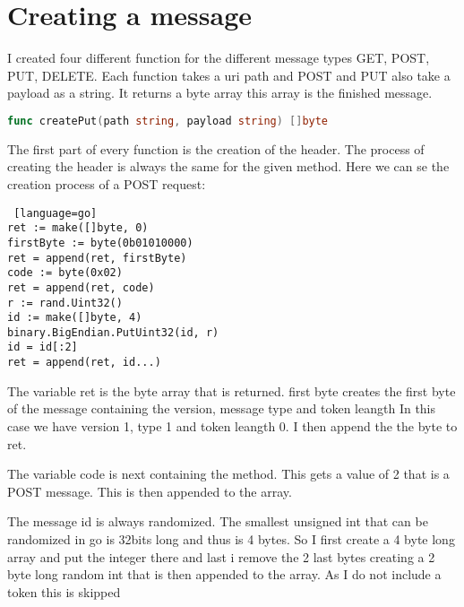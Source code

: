 \documentclass{article}
\title{\gettitle}
\author{\getauthor}
\date{\daymonthyear\today} %
\newcommand{\getauthor}{Elias Berglin} %
\newcommand{\gettitle}{COAP implementation} %
\begin{document}
    \maketitle
    \newpage

    \fancyhf{}
    \lhead{\getauthor}
    \rhead{\gettitle}
    \rfoot \thepage

    \section{Creating a message}
    I created four different function for the different message types GET, POST, PUT, DELETE.
    Each function takes a uri path and POST and PUT also take a payload as a string. It returns a byte array
    this array is the finished message. 
    \begin{lstlisting}[language=go]
func createPut(path string, payload string) []byte
    \end{lstlisting}
    The first part of every function is the creation of the header.
    The process of creating the header is always the same for the given method.
    Here we can se the creation process of a POST request:
    \begin{lstlisting} [language=go]
ret := make([]byte, 0)
firstByte := byte(0b01010000)
ret = append(ret, firstByte)
code := byte(0x02)
ret = append(ret, code)
r := rand.Uint32()
id := make([]byte, 4)
binary.BigEndian.PutUint32(id, r)
id = id[:2]
ret = append(ret, id...)
    \end{lstlisting}
    The variable ret is the byte array that is returned. 
    first byte creates the first byte of the message containing the version, message type and token leangth
    In this case we have version 1, type 1 and token leangth 0.
    I then append the the byte to ret.

    The variable code is next containing the method. This gets a value of 2 that is a POST message.
    This is then appended to the array.

    The message id is always randomized. The smallest unsigned int that can be randomized in go is 32bits
    long and thus is 4  bytes. So I first create a 4 byte long array and put the integer there and last i remove the 2 last bytes
    creating a 2 byte long random int that is then appended to the array.
    As I do not include a token this is skipped
\end{document}
